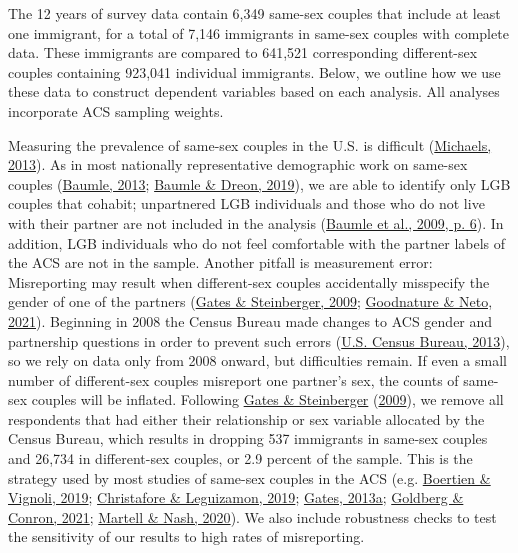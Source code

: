 \documentclass[
  12pt,
]{article}
\begin{document}
The 12 years of survey data contain 6,349 same-sex couples that include at least one immigrant, for a total of 7,146 immigrants in same-sex couples with complete data. These immigrants are compared to 641,521 corresponding different-sex couples containing 923,041 individual immigrants. Below, we outline how we use these data to construct dependent variables based on each analysis. All analyses incorporate ACS sampling weights.

Measuring the prevalence of same-sex couples in the U.S. is difficult (\protect\hyperlink{ref-michaels_2013}{Michaels, 2013}). As in most nationally representative demographic work on same-sex couples (\protect\hyperlink{ref-baumle_2013}{Baumle, 2013}; \protect\hyperlink{ref-baumle_2019}{Baumle \& Dreon, 2019}), we are able to identify only LGB couples that cohabit; unpartnered LGB individuals and those who do not live with their partner are not included in the analysis (\protect\hyperlink{ref-baumle_2009}{Baumle et al., 2009, p. 6}). In addition, LGB individuals who do not feel comfortable with the partner labels of the ACS are not in the sample. Another pitfall is measurement error: Misreporting may result when different-sex couples accidentally misspecify the gender of one of the partners (\protect\hyperlink{ref-gates_2009}{Gates \& Steinberger, 2009}; \protect\hyperlink{ref-goodnature_2021}{Goodnature \& Neto, 2021}). Beginning in 2008 the Census Bureau made changes to ACS gender and partnership questions in order to prevent such errors (\protect\hyperlink{ref-u.s.censusbureau_2013}{U.S. Census Bureau, 2013}), so we rely on data only from 2008 onward, but difficulties remain. If even a small number of different-sex couples misreport one partner's sex, the counts of same-sex couples will be inflated. Following \protect\hyperlink{ref-gates_2009}{Gates \& Steinberger} (\protect\hyperlink{ref-gates_2009}{2009}), we remove all respondents that had either their relationship or sex variable allocated by the Census Bureau, which results in dropping 537 immigrants in same-sex couples and 26,734 in different-sex couples, or 2.9 percent of the sample. This is the strategy used by most studies of same-sex couples in the ACS (e.g. \protect\hyperlink{ref-boertien_2019}{Boertien \& Vignoli, 2019}; \protect\hyperlink{ref-christafore_2019}{Christafore \& Leguizamon, 2019}; \protect\hyperlink{ref-gates_2013}{Gates, 2013a}; \protect\hyperlink{ref-goldberg_2021}{Goldberg \& Conron, 2021}; \protect\hyperlink{ref-martell_2020}{Martell \& Nash, 2020}). We also include robustness checks to test the sensitivity of our results to high rates of misreporting.
\end{document}
